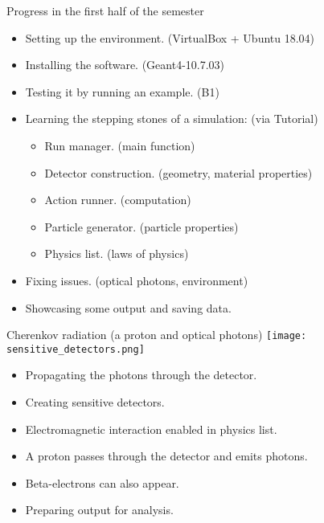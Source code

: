 \documentclass[11pt]{beamer}
\begin{document}
\begin{frame}{Progress in the first half of the semester}
    \begin{itemize}
        \item<tri@1-> Setting up the environment. (VirtualBox + Ubuntu 18.04)
        \vspace{0.2 cm}
        \item<tri@1-> Installing the software. (Geant4-10.7.03)
        \vspace{0.2 cm}
        \item<tri@1-> Testing it by running an example. (B1)
        \vspace{0.2 cm}
        \item<tri@1-> Learning the stepping stones of a simulation: (via Tutorial)
        \vspace{0.1 cm}
        \begin{itemize}
            \item<square@1-> Run manager. (main function)
            \vspace{0.1 cm}
            \item<square@1-> Detector construction. (geometry, material properties)
            \vspace{0.1 cm}
            \item<square@1-> Action runner. (computation)
            \vspace{0.1 cm}
            \item<square@1-> Particle generator. (particle properties)
            \vspace{0.1 cm}
            \item<square@1-> Physics list. (laws of physics)
        \end{itemize}
        \vspace{0.2 cm}
        \item<tri@1-> Fixing issues. (optical photons, environment)
        \vspace{0.2 cm}
        \item<tri@1-> Showcasing some output and saving data.
    \end{itemize}
\end{frame}

\begin{frame}{Cherenkov radiation (a proton and optical photons)}
    \centering
    \texttt{[image: sensitive\_detectors.png]}
    \begin{itemize}
        \item<tri@1-> Propagating the photons through the detector.
        \item<tri@1-> Creating sensitive detectors.
        \item<tri@1-> Electromagnetic interaction enabled in physics list.
        \item<tri@1-> A proton passes through the detector and emits photons.
        \item<tri@1-> Beta-electrons can also appear.
        \item<tri@1-> Preparing output for analysis.
    \end{itemize}
\end{frame}
\end{document}
